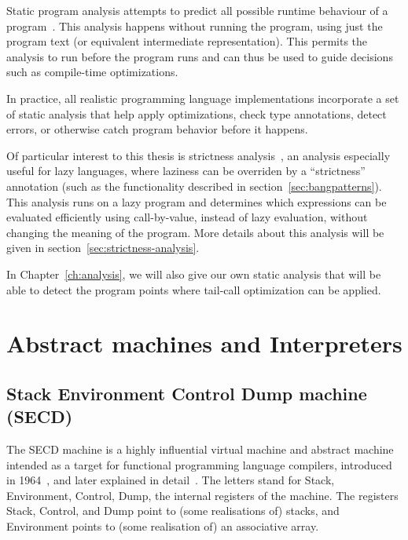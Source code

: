 \documentclass[diploma]{softlab-thesis}
\begin{document}


Static program analysis attempts to predict all possible runtime
behaviour of a program~\cite{Nielson:2010:PPA:1965094}. This analysis
happens without running the program, using just the program text (or
equivalent intermediate representation). This permits the analysis to
run before the program runs and can thus be used to guide decisions
such as compile-time optimizations.

In practice, all realistic programming language implementations
incorporate a set of static analysis that help apply optimizations,
check type annotations, detect errors, or otherwise catch program
behavior before it happens.

Of particular interest to this thesis is strictness
analysis~\cite{PeytonJones:1991:UVF:645420.652528,Holdermans:2010:MSM:2088270.2088274},
an analysis especially useful for lazy languages, where laziness can
be overriden by a ``strictness'' annotation (such as the functionality
described in section~\ref{sec:bangpatterns}). This analysis runs on a
lazy program and determines which expressions can be evaluated
efficiently using call-by-value, instead of lazy evaluation, without
changing the meaning of the program. More details about this analysis will be given in section~\ref{sec:strictness-analysis}.


In Chapter~\ref{ch:analysis}, we will also give our own static
analysis that will be able to detect the program points where
tail-call optimization can be applied.

\section{Abstract machines and Interpreters}
\label{sec:abstract-machines}

\subsection {Stack Environment Control Dump machine (SECD)}
\label{sec:secd}

The SECD machine is a highly influential virtual machine and abstract 
machine intended as a target for functional programming 
language compilers, introduced in 1964~\cite{La64}, and later explained
in detail~\cite{Danvy:2004:RDL:2154439.2154443}. The letters stand for Stack, Environment, 
Control, Dump, the internal registers of the machine. 
The registers Stack, Control, and Dump point to (some 
realisations of) stacks, and Environment points to (some 
realisation of) an associative array.
\end{document}
